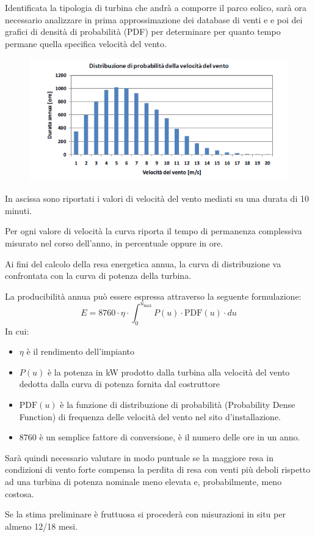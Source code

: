 \documentclass[a4paper, 15pt]{article}
\begin{document}
\begin{adjustwidth}{2in}{}
	Identificata la tipologia di turbina che andrà a comporre il parco eolico, sarà ora necessario analizzare in prima approssimazione dei database di venti e e poi dei grafici di densità di probabilità (PDF) per determinare per quanto tempo permane quella specifica velocità del vento.
	\begin{figure}[H]
		\centering
		\includegraphics[width=0.5\linewidth]{immagini/eoliche10}
		\label{fig:eoliche10}
	\end{figure}
	In ascissa sono riportati i valori di velocità del
	vento mediati su una durata di 10 minuti.
	
	Per ogni valore di velocità la curva riporta il
	tempo di permanenza complessiva misurato nel
	corso dell’anno, in percentuale oppure in ore.
	
	Ai fini del calcolo della resa energetica annua, la
	curva di distribuzione va confrontata con la curva
	di potenza della turbina. \newline 
	
	
	La producibilità annua può essere espressa attraverso la seguente formulazione:
	\[E = 8760\cdot\eta\cdot\int_{0}^{u_{\max}}P(u)\cdot\text{PDF}(u)\cdot du\]
	In cui: 
	\begin{itemize}
		\item $\eta$ è il rendimento dell'impianto
		\item $P(u)$ è la potenza in kW prodotto dalla turbina alla velocità del vento dedotta dalla curva di potenza fornita dal costruttore
		\item $\text{PDF}(u)$ è la funzione di distribuzione di probabilità (Probability Dense Function) di frequenza delle velocità del vento nel sito d'installazione. 
		\item $8760$ è un semplice fattore di conversione, è il numero delle ore in un anno. 
	\end{itemize}
	
	\vspace{0.5cm}
	Sarà quindi necessario valutare in modo puntuale se la
	maggiore resa in condizioni di vento forte
	compensa la perdita di resa con venti più deboli
	rispetto ad una turbina di potenza nominale
	meno elevata e, probabilmente, meno
	costosa. \newline 
	
	Se la stima preliminare è fruttuosa si procederà con misurazioni in situ per almeno 12/18 mesi. 
\end{adjustwidth}
\end{document}
